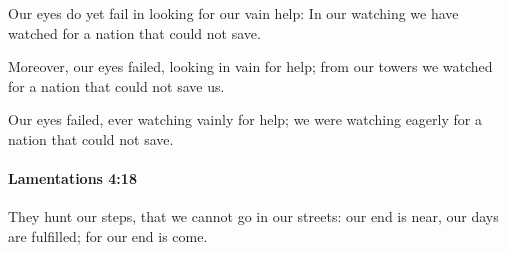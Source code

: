 			\begin{versebox}
					\item[BHS] 
					\item[LXX] 
					\item[ASV] Our eyes do yet fail in looking for our vain help: In our watching we have watched for a nation that could not save.
					\item[NIV] Moreover, our eyes failed, looking in vain for help; from our towers we watched for a nation that could not save us.
					\item[NRSV] Our eyes failed, ever watching vainly for help; we were watching eagerly for a nation that could not save.
			\end{versebox}

		\paragraph{Lamentations 4:18} %
			\label{LAMENTATIONS-4-18}

			They hunt our steps, that we cannot go in our streets: our end is near, our days are fulfilled; for our end is come.

